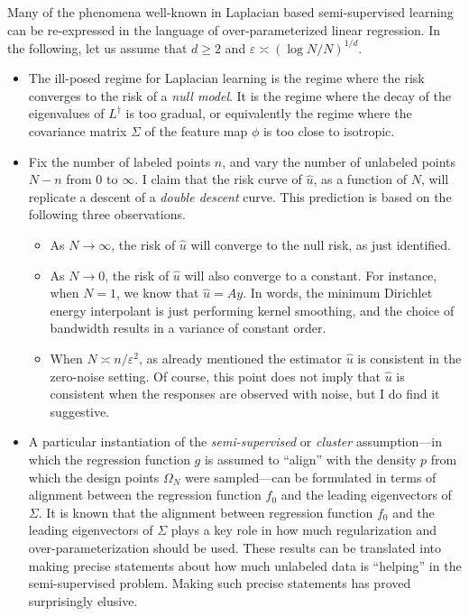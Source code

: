 \documentclass{article}
\newcommand{\1}{\mathbf{1}}
\newcommand{\wh}[1]{\widehat{#1}}
\theoremstyle{definition}
\theoremstyle{remark}
\begin{document}
 Many of the phenomena well-known in Laplacian based semi-supervised learning can be re-expressed in the language of over-parameterized linear regression. In the following, let us assume that $d \geq 2$ and $\varepsilon \asymp (\log N/N)^{1/d}$.
\begin{itemize}
	\item The ill-posed regime for Laplacian learning is the regime where the risk converges to the risk of a \emph{null model}. It is the regime where the decay of the eigenvalues of $L^{\dagger}$ is too gradual, or equivalently the regime where the covariance matrix $\Sigma$ of the feature map $\phi$ is too close to isotropic.
	\item Fix the number of labeled points $n$, and vary the number of unlabeled points $N - n$ from $0$ to $\infty$. I claim that the risk curve of $\wh{u}$, as a function of $N$, will replicate a descent of a \emph{double descent} curve. This prediction is based on the following three observations.
	\begin{itemize}
		\item As $N \to \infty$, the risk of $\wh{u}$ will converge to the null risk, as just identified.
		\item As $N \to 0$, the risk of $\wh{u}$ will also converge to a constant. For instance, when $N = 1$, we know that $\wh{u} = Ay$. In words, the minimum Dirichlet energy interpolant is just performing kernel smoothing, and the choice of bandwidth results in a variance of constant order. 
		\item When $N \asymp n/\varepsilon^2$, as already mentioned the estimator $\wh{u}$ is consistent in the zero-noise setting. Of course, this point does not imply that $\wh{u}$ is consistent when the responses are observed with noise, but I do find it suggestive.
	\end{itemize} 
	\item A particular instantiation of the \emph{semi-supervised} or \emph{cluster} assumption---in which the regression function $g$ is assumed to ``align'' with the density $p$ from which the design points $\Omega_N$ were sampled---can be formulated in terms of alignment between the regression function $f_0$ and the leading eigenvectors of $\Sigma$. It is known that the alignment between regression function $f_0$ and the leading eigenvectors of $\Sigma$ plays a key role in how much regularization and over-parameterization should be used. These results can be translated into making precise statements about how much unlabeled data is ``helping'' in the semi-supervised problem. Making such precise statements has proved surprisingly elusive.
\end{itemize}
\end{document}
